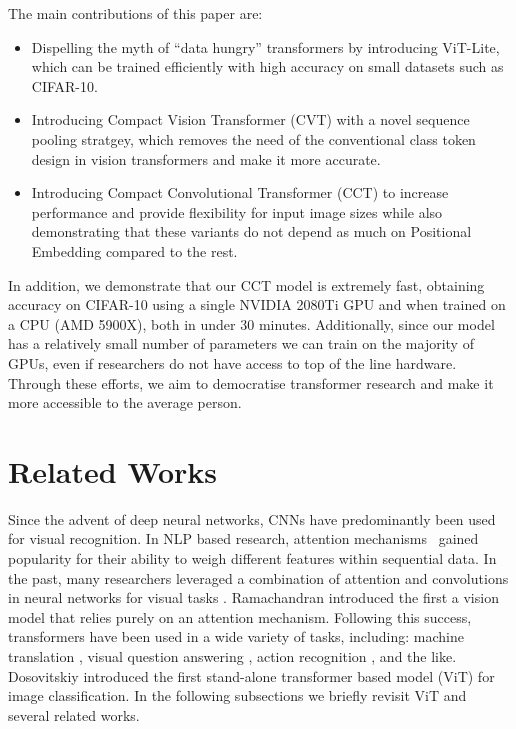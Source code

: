\documentclass[10pt,twocolumn,letterpaper]{article}
\begin{document}
The main contributions of this paper are:
\begin{itemize}
    \item Dispelling the myth of ``data hungry'' transformers by introducing ViT-Lite, which can be trained efficiently with high accuracy on small datasets such as CIFAR-10.
    \item Introducing Compact Vision Transformer (CVT) with a novel sequence pooling stratgey, which removes the need of the conventional class token design in vision transformers and make it more accurate.
    \item Introducing Compact Convolutional Transformer (CCT) to increase performance and provide flexibility for input image sizes while also demonstrating that these variants do not depend as much on Positional Embedding compared to the rest.
\end{itemize}

In addition, we demonstrate that our CCT model is extremely fast, obtaining  accuracy on CIFAR-10 using a single NVIDIA 2080Ti GPU and  when trained on a CPU (AMD 5900X), both in under 30 minutes. 
Additionally, since our model has a relatively small number of parameters we can train on the majority of GPUs, even if researchers do not have access to top of the line hardware.
Through these efforts, we aim to democratise transformer research and make it more accessible to the average person. 

\section{Related Works}
\label{sec:related}

Since the advent of deep neural networks, CNNs have predominantly been used for visual recognition. 
In NLP based research, attention mechanisms~\cite{graves2014neural,bahdanau2016neural,luong2015effective} gained popularity for their ability to weigh different features within sequential data. 
In the past, many researchers leveraged a combination of attention and convolutions in neural networks for visual tasks \cite{bello2019attention, hu2019local, hu2018squeeze, wang2017residual, zhang2019self}. 
Ramachandran \etal \cite{ramachandran2019stand} introduced the first a vision model that relies purely on an attention mechanism. 
Following this success, transformers have been used in a wide variety of tasks, including: machine translation \cite{devlin2019bert, liu2019roberta, yang2019xlnet}, visual question answering \cite{lu2019vilbert, su2019vl}, action recognition \cite{ bertasius2021space, girdhar2019video}, and the like. Dosovitskiy \etal \cite{dosovitskiy2020image} introduced the first stand-alone transformer based model (ViT) for image classification. In the following subsections we briefly revisit ViT and several related works.
\end{document}
